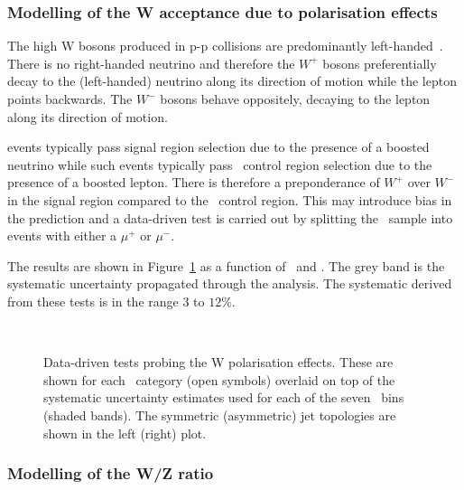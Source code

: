 \subsubsection{Modelling of the W acceptance due to polarisation effects}

The high \pt W bosons produced in p-p collisions are predominantly left-handed~\cite{lhW}. 
There is no right-handed neutrino and therefore the $W^{+}$ bosons 
preferentially decay to the (left-handed) neutrino along 
its direction of motion while the lepton points backwards. 
The $W^{-}$ bosons behave oppositely, decaying
to the lepton along its direction of motion. 

\wj events typically pass signal region selection due to
the presence of a boosted neutrino while such events typically
pass \mj~control region selection due to the presence of a boosted lepton.
There is therefore a preponderance of $W^{+}$ over $W^{-}$ in the 
signal region compared to the \mj~control region. This may introduce bias
in the prediction and a data-driven test is carried out by splitting the \mj~sample into events 
with either a $\mu^{+}$ or $\mu^{-}$.

The results are shown in Figure~\ref{fig:closureMuPToMuM} as a function of \scalht~and \njet. 
The grey band is the systematic uncertainty propagated through the analysis.
The systematic derived from these tests is in the range $3$ to $12\%$.



\begin{figure}[h!]
  \begin{center}
    ~~
    \caption{Data-driven tests probing the W polarisation effects. 
      These are shown for each
      \njet~category (open symbols) overlaid on top of the systematic
      uncertainty estimates used for each of the seven \scalht~bins
      (shaded bands). 
      The symmetric (asymmetric) jet topologies are shown in the left (right) plot.       
    }
    \label{fig:closureMuPToMuM}
  \end{center} 
\end{figure}

\subsubsection{Modelling of the W/Z ratio}

